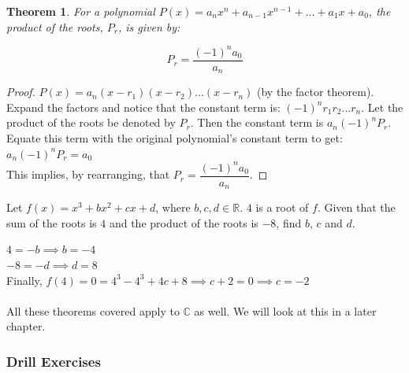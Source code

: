 \documentclass[12pt, a4paper, titlepage, twoside]{article}
\newcommand*{\R}{\mathbb{R}}
\newcommand*{\C}{\mathbb{C}}
\newtheorem*{theorem*}{Theorem}
\begin{document}
	\begin{pf}
		\begin{theorem*}
			For a polynomial $P(x) = a_n x^n + a_{n-1} x^{n-1} + ... + a_1 x + a_0$, the product of the roots, $P_r$, is
			given by:
			
			$$P_r = \dfrac{(-1)^n a_0}{a_n}$$
		\end{theorem*}
		
		\tcbline		
		
		\begin{proof}
			$P(x) = a_n(x-r_1)(x-r_2)...(x-r_n)$ (by the factor theorem).\\
			
			Expand the factors and notice that the constant term is: $(-1)^n r_1 r_2 ... r_n$. Let the product of the roots
			be denoted by $P_r$. Then the constant term is $a_n (-1)^n P_r$.\\
			
			Equate this term with the original polynomial's constant term to get: $a_n (-1)^n P_r = a_0$\\
			
			This implies, by rearranging, that $P_r = \dfrac{(-1)^n a_0}{a_n}$.	
		\end{proof}
	\end{pf}

	\begin{ex}
		Let $f(x) = x^3 + bx^2 + cx + d$, where $b,c,d \in \R$. $4$ is a root of $f$.
		Given that the sum of the roots is $4$ and the product of the roots is $-8$, find $b$, $c$ and $d$.
		
		\hfill
		\tcbline
		\hfill
		
		$4 = -b \implies b = -4$\\
		
		$-8 = -d \implies d = 8$\\
		
		Finally, $f(4) = 0 = 4^3 - 4^3 + 4c + 8 \implies c + 2 = 0 \implies c = -2$
	\end{ex}
	
	\paragraph{}
	All these theorems covered apply to $\C$ as well. We will look at this in a later chapter.
	
	\subsubsection*{Drill Exercises}
	
\end{document}
